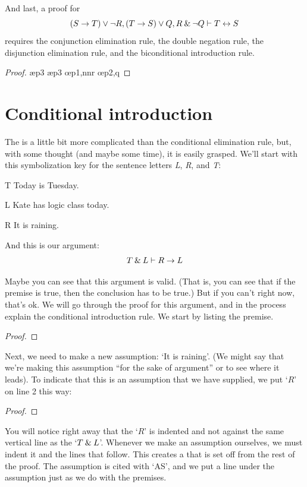 \begin{earg}
\item[\ex{14.6.5}] And last, a proof for $$(S \rightarrow T) \vee {\neg} R, (T \rightarrow S) \vee Q, R \mathbin{\&} {\neg} Q \vdash T \leftrightarrow S$$ requires the conjunction elimination rule, the double negation rule, the disjunction elimination rule, and the biconditional introduction rule.
\begin{proof}
	 \pr{}
	 \pr{}
	 \pr{}
	 \ae{p3}
	 \ae{p3}
	 
	 \oe{p1,nnr}
	 \oe{p2,q}
	 
\end{proof}\medskip
\end{earg}


\section{Conditional introduction}
\label{s:CI-rule}

The  is a little bit more complicated than the conditional elimination rule, but, with some thought (and maybe some time), it is easily grasped. We'll start with this symbolization key for the sentence letters \textit{L}, \textit{R}, and \textit{T}:
	\begin{ekey}
		\item[T] Today is Tuesday.
		\item[L] Kate has logic class today.
		\item[R] It is raining.
	\end{ekey}
And this is our argument: 
$$T \mathbin{\&} L \vdash R \rightarrow L$$
 
Maybe you can see that this argument is valid. (That is, you can see that if the premise is true, then the conclusion has to be true.) But if you can't right now, that's ok. We will go through the proof for this argument, and in the process explain the conditional introduction rule. We start by listing the premise.
	\begin{proof}
		 \pr{}
	\end{proof}
Next, we need to make a new assumption: `It is raining'. (We might say that we're making this assumption ``for the sake of argument'' or to see where it leads). To indicate that this is an assumption that we have supplied, we put `$R$' on line 2 this way:
	\begin{proof}
		 \pr{}
		\open
			 \as{}
	\end{proof}
You will notice right away that the `$R$' is indented and not against the same vertical line as the `$T \mathbin{\&} L$'. Whenever we make an assumption ourselves, we must indent it and the lines that follow. This creates a  that is set off from the rest of the proof. The assumption is cited with `AS', and we put a line under the assumption just as we do with the premises.

